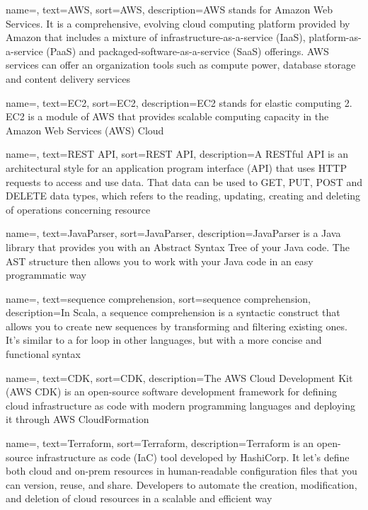 {
    name=,
    text=AWS,
    sort=AWS,
    description={AWS stands for Amazon Web Services. It is a comprehensive, evolving cloud computing platform provided by Amazon that includes a mixture of infrastructure-as-a-service (IaaS), platform-as-a-service (PaaS) and packaged-software-as-a-service (SaaS) offerings. AWS services can offer an organization tools such as compute power, database storage and content delivery services}
}


{
    name=,
    text=EC2,
    sort=EC2,
    description={EC2 stands for elastic computing 2. EC2 is a module of AWS that provides scalable computing capacity in the Amazon Web Services (AWS) Cloud }
}

{
    name=,
    text=REST API,
    sort=REST API,
    description={A RESTful API is an architectural style for an application program interface (API) that uses HTTP requests to access and use data. That data can be used to GET, PUT, POST and DELETE data types, which refers to the reading, updating, creating and deleting of operations concerning resource}
}

{
    name=,
    text=JavaParser,
    sort=JavaParser,
    description={JavaParser is a Java library that provides you with an Abstract Syntax Tree of your Java code. The AST structure then allows you to work with your Java code in an easy programmatic way}
}

{
    name=,
    text=sequence comprehension,
    sort=sequence comprehension,
    description={In Scala, a sequence comprehension is a syntactic construct that allows you to create new sequences by transforming and filtering existing ones. It's similar to a for loop in other languages, but with a more concise and functional syntax }
}

{
    name=,
    text=CDK,
    sort=CDK,
    description={The AWS Cloud Development Kit (AWS CDK) is an open-source software development framework for defining cloud infrastructure as code with modern programming languages and deploying it through AWS CloudFormation}
}

{
    name=,
    text=Terraform,
    sort=Terraform,
    description={Terraform is an open-source infrastructure as code (IaC) tool developed by HashiCorp. It let's define both cloud and on-prem resources in human-readable configuration files that you can version, reuse, and share. Developers to automate the creation, modification, and deletion of cloud resources in a scalable and efficient way}
}

